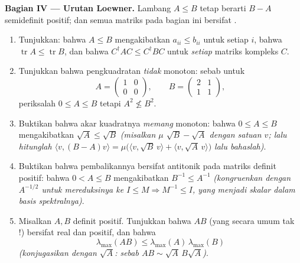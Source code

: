 \begin{problem}
\medskip
\noindent\textbf{Bagian IV --- Urutan Loewner.} Lambang $A \leq B$
tetap berarti $B - A$ semidefinit positif; dan semua matriks pada
bagian ini bersifat .
\begin{enumerate}[resume]
  \item Tunjukkan: bahwa $A \leq B$ mengakibatkan $a_{ii} \leq b_{ii}$ untuk setiap
        $i$, bahwa $\operatorname{tr} A \leq \operatorname{tr} B$,
        dan bahwa $C^\dagger AC \leq C^\dagger BC$ untuk \emph{setiap}
        matriks kompleks $C$.
  \item Tunjukkan bahwa pengkuadratan \emph{tidak} monoton: sebab untuk
        \[
        A = \begin{pmatrix} 1 & 0\\ 0 & 0\end{pmatrix},
        \qquad
        B = \begin{pmatrix} 2 & 1\\ 1 & 1\end{pmatrix},
        \]
        periksalah $0 \leq A \leq B$ tetapi $A^2 \not\leq B^2$.
  \item Buktikan bahwa akar kuadratnya \emph{memang} monoton: bahwa $0 \leq
        A \leq B$ mengakibatkan $\sqrt A \leq \sqrt B$ \emph{(misalkan
        $\mu$  $\sqrt B - \sqrt A$ dengan 
        satuan $v$; lalu hitunglah $\langle v, (B - A)v\rangle =
        \mu\bigl(\langle v, \sqrt B\,v\rangle + \langle v,
        \sqrt A\,v\rangle\bigr)$ lalu bahaslah)}.
  \item Buktikan bahwa pembalikannya bersifat antitonik pada matriks
        definit positif: bahwa $0 < A \leq B$ mengakibatkan $B^{-1} \leq A^{-1}$
        \emph{(kongruenkan dengan $A^{-1/2}$ untuk mereduksinya ke $I \leq M
        \Rightarrow M^{-1} \leq I$, yang menjadi skalar dalam basis
        spektralnya)}.
  \item Misalkan $A, B$ definit positif. Tunjukkan bahwa
         $AB$ (yang secara umum tak !) bersifat
        real dan positif, dan bahwa
        \[
        \lambda_{\max}(AB) \leq
        \lambda_{\max}(A)\,\lambda_{\max}(B)
        \]
        \emph{(konjugasikan dengan $\sqrt A$: sebab $AB \sim \sqrt
        A\,B\sqrt A$)}.
\end{enumerate}


\end{problem}
